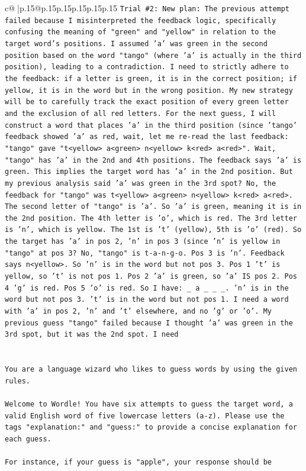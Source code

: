 \documentclass{article}
\begin{document}
{\begin{supertabular}{c@{$\;$}|p{.15\linewidth}@{}p{.15\linewidth}p{.15\linewidth}p{.15\linewidth}p{.15\linewidth}p{.15\linewidth}}
{{{\texttt{Trial \#2: New plan: The previous attempt failed because I misinterpreted the feedback logic, specifically confusing the meaning of "green" and "yellow" in relation to the target word's positions. I assumed 'a' was green in the second position based on the word "tango" (where 'a' is actually in the third position), leading to a contradiction. I need to strictly adhere to the feedback: if a letter is green, it is in the correct position; if yellow, it is in the word but in the wrong position. My new strategy will be to carefully track the exact position of every green letter and the exclusion of all red letters. For the next guess, I will construct a word that places 'a' in the third position (since 'tango' feedback showed 'a' as red, wait, let me re{-}read the last feedback: "tango" gave "t<yellow> a<green> n<yellow> k<red> a<red>". Wait, "tango" has 'a' in the 2nd and 4th positions. The feedback says 'a' is green. This implies the target word has 'a' in the 2nd position. But my previous analysis said 'a' was green in the 3rd spot? No, the feedback for "tango" was t<yellow> a<green> n<yellow> k<red> a<red>. The second letter of "tango" is 'a'. So 'a' is green, meaning it is in the 2nd position. The 4th letter is 'o', which is red. The 3rd letter is 'n', which is yellow. The 1st is 't' (yellow), 5th is 'o' (red). So the target has 'a' in pos 2, 'n' in pos 3 (since 'n' is yellow in "tango" at pos 3? No, "tango" is t{-}a{-}n{-}g{-}o. Pos 3 is 'n'. Feedback says n<yellow>. So 'n' is in the word but not pos 3. Pos 1 't' is yellow, so 't' is not pos 1. Pos 2 'a' is green, so 'a' IS pos 2. Pos 4 'g' is red. Pos 5 'o' is red. So I have: \_ a \_ \_ \_. 'n' is in the word but not pos 3. 't' is in the word but not pos 1. I need a word with 'a' in pos 2, 'n' and 't' elsewhere, and no 'g' or 'o'. My previous guess "tango" failed because I thought 'a' was green in the 3rd spot, but it was the 2nd spot. I need} \\
\\ 
\\ 
\texttt{You are a language wizard who likes to guess words by using the given rules.} \\
\\ 
\texttt{Welcome to Wordle! You have six attempts to guess the target word, a valid English word of five lowercase letters (a{-}z). Please use the tags "explanation:" and "guess:" to provide a concise explanation for each guess.} \\
\\ 
\texttt{For instance, if your guess is "apple", your response should be} \\
}}}
\end{supertabular}}
\end{document}
